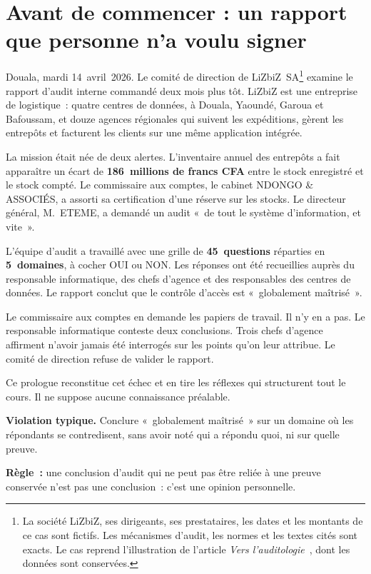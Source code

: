 \bigskip

\section*{Avant de commencer : un rapport que personne n'a voulu signer}

Douala, mardi 14~avril~2026. Le comité de direction de LiZbiZ~SA\footnote{La
société LiZbiZ, ses dirigeants, ses prestataires, les dates et les montants
de ce cas sont fictifs. Les mécanismes d'audit, les normes et les textes
cités sont exacts. Le cas reprend l'illustration de l'article
\emph{Vers l'auditologie}~\cite{minka2026auditologie}, dont les données sont
conservées.} examine le rapport d'audit interne commandé deux mois plus tôt.
LiZbiZ est une entreprise de logistique~: quatre centres de données, à
Douala, Yaoundé, Garoua et Bafoussam, et douze agences régionales qui
suivent les expéditions, gèrent les entrepôts et facturent les clients sur
une même application intégrée.

La mission était née de deux alertes. L'inventaire annuel des entrepôts a
fait apparaître un écart de \textbf{186~millions de francs CFA} entre le
stock enregistré et le stock compté. Le commissaire aux comptes, le
cabinet NDONGO \& ASSOCIÉS, a assorti sa certification d'une réserve sur
les stocks. Le directeur général, M.~ETEME, a demandé un audit «~de tout le
système d'information, et vite~».

L'équipe d'audit a travaillé avec une grille de \textbf{45~questions}
réparties en \textbf{5~domaines}, à cocher OUI ou NON. Les réponses ont été
recueillies auprès du responsable informatique, des chefs d'agence et des
responsables des centres de données. Le rapport conclut que le contrôle
d'accès est «~globalement maîtrisé~».

Le commissaire aux comptes en demande les papiers de travail. Il n'y en a
pas. Le responsable informatique conteste deux conclusions. Trois chefs
d'agence affirment n'avoir jamais été interrogés sur les points qu'on leur
attribue. Le comité de direction refuse de valider le rapport.

\medskip

Ce prologue reconstitue cet échec et en tire les réflexes qui structurent
tout le cours. Il ne suppose aucune connaissance préalable.

\begin{boxalert}
\textbf{Violation typique.} Conclure «~globalement maîtrisé~» sur un domaine
où les répondants se contredisent, sans avoir noté qui a répondu quoi, ni
sur quelle preuve.

\smallskip
\textbf{Règle~:} une conclusion d'audit qui ne peut pas être reliée à une
preuve conservée n'est pas une conclusion~: c'est une opinion personnelle.
\end{boxalert}

